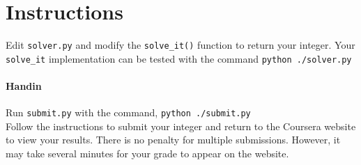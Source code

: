\documentclass[11pt]{article}
\begin{document}
\section{Instructions}

Edit \texttt{solver.py} and modify the \texttt{solve\_it()} function to return your integer.  Your \texttt{solve\_it} implementation can be tested with the command \texttt{python ./solver.py}

\paragraph{Handin}
Run \texttt{submit.py} with the command,
\texttt{python ./submit.py}\\
Follow the instructions to submit your integer and return to the Coursera website to view your results.  There is no penalty for multiple submissions.  However, it may take several minutes for your grade to appear on the website.


\end{document}

